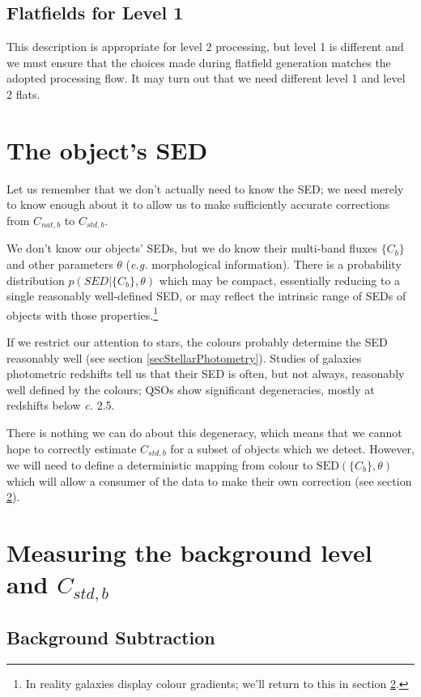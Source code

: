 \documentclass[12pt]{article}
\renewcommand{\c}{\textit{c.}\xspace}
\newcommand{\eg}{\textit{e.g.}\xspace}
\begin{document}
\subsection{Flatfields for Level 1}

This description is appropriate for level 2 processing, but level 1 is different and we must ensure that the
choices made during flatfield generation matches the adopted processing flow.  It may turn out that we need
different level 1 and level 2 flats.

\section{The object's SED}
\label{secSED}

Let us remember that we don't actually need to know the SED; we need merely to know enough about it to allow
us to make sufficiently accurate corrections from $C_{nat, b}$ to $C_{std, b}$.

We don't know our objects' SEDs, but we do know their multi-band fluxes $\{C_b\}$ and other parameters
$\theta$ (\eg morphological information).  There is a probability distribution $p(SED|\{C_b\}, \theta)$ which
may be compact, essentially reducing to a single reasonably well-defined SED, or may reflect the intrinsic
range of SEDs of objects with those properties.\footnote{
  In reality galaxies display colour gradients; we'll return to this in section \ref{secMeasuring}.
}

If we restrict our attention to stars, the colours probably determine the SED reasonably well (see
section \ref{secStellarPhotometry}).  Studies of galaxies photometric redshifts tell us that their SED is
often, but not always, reasonably well defined by the colours; QSOs show significant degeneracies, mostly
at redshifts below \c 2.5.

There is nothing we can do about this degeneracy, which means that we cannot hope to correctly estimate
$C_{std, b}$ for a subset of objects which we detect.  However, we will need to define a deterministic mapping
from colour to $\mbox{SED}(\{C_b\}, \theta)$ which will allow a consumer of the data to make their own
correction (see section \ref{secMeasuring}).

\section{Measuring the background level and $C_{std, b}$}
\label{secMeasuring}

\subsection{Background Subtraction}
\end{document}
